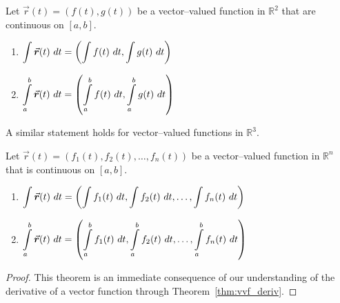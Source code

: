 \ifcalculus
\pagebreak
\begin{theorem}\label{thm:vvf_integration}
Let $\vec r(t) = \left( f(t),g(t)\right)$ be a vector--valued function in $\mathbb{R}^2$ that are continuous on $[a,b]$.
\begin{enumerate}
	\item $\ds \int \vec r(t)\ dt = \left( \int f(t)\ dt, \int g(t)\ dt\right)$
	\item	$\ds \int\limits_a^b \vec r(t)\ dt = \left( \int\limits_a^b f(t)\ dt, \int\limits_a^b g(t)\ dt\right)$
\end{enumerate}
A similar statement holds for vector--valued functions in $\mathbb{R}^3$.
\end{theorem}
\fi

\ifanalysis
\begin{theorem}\label{thm:vvf_integration}
Let $\vec r(t) = \left( f_1(t),f_2(t),\ldots,f_n(t)\right)$ be a vector--valued function in $\mathbb{R}^n$ that is continuous on $[a,b]$.
\begin{enumerate}
	\item $\ds \int \vec r(t)\ dt = \left( \int f_1(t)\ dt,\int f_2(t)\ dt,\ldots, \int f_n(t)\ dt\right)$
	\item	$\ds \int\limits_a^b \vec r(t)\ dt = \left( \int\limits_a^b f_1(t)\ dt,\int\limits_a^b f_2(t)\ dt,\ldots, \int\limits_a^b f_n(t)\ dt\right)$
\end{enumerate}
\end{theorem}
\fi



\ifanalysis

\begin{proof}
This theorem is an immediate consequence of our understanding of the derivative of a vector function through Theorem~\ref{thm:vvf_deriv}.
\end{proof}

\fi




